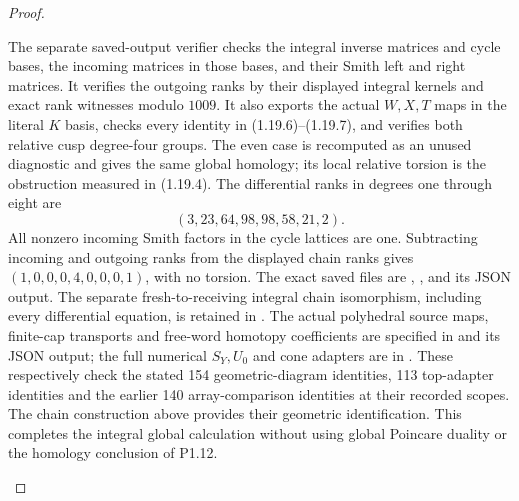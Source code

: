 \begin{proof}
\begin{enumerate}[label=\arabic*.]
The separate saved-output verifier checks the integral inverse
matrices and cycle bases, the incoming matrices in those bases, and
their Smith left and right matrices.  It verifies the outgoing ranks
by their displayed integral kernels and exact rank witnesses modulo
$1009$.  It also exports the actual $W,X,T$ maps in the literal $K$
basis, checks every identity in (1.19.6)--(1.19.7), and verifies both
relative cusp degree-four groups.  The even case is recomputed as
an unused diagnostic and gives the same global homology; its local
relative torsion is the obstruction measured in (1.19.4).
The differential ranks in degrees one through eight are
\[
                 (3,23,64,98,98,58,21,2).
\]
All nonzero incoming Smith factors in the cycle lattices are one.
Subtracting incoming and outgoing ranks from the displayed chain
ranks gives $(1,0,0,0,4,0,0,0,1)$, with no torsion.
The exact saved files are
,
,
and its JSON output. The separate fresh-to-receiving integral
chain isomorphism, including every differential equation, is retained
in .
The actual polyhedral source maps, finite-cap transports and
free-word homotopy coefficients are specified in
and its JSON output; the full numerical $S_Y,U_0$ and cone adapters
are in .
These respectively check the stated 154 geometric-diagram identities,
113 top-adapter identities and the earlier 140 array-comparison
identities at their recorded scopes. The chain construction above
provides their geometric identification. This completes the integral
global calculation without using global Poincare duality or the
homology conclusion of P1.12.

\end{enumerate}
\end{proof}
